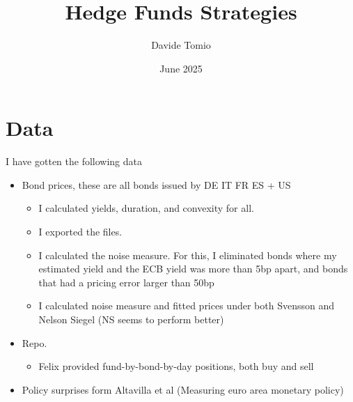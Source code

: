 \documentclass[12pt]{article}
\title{Hedge Funds Strategies}
\author{Davide Tomio}
\date{June 2025}
\begin{document}
\maketitle

\section{Data}

I have gotten the following data
\begin{itemize}
    \item Bond prices, these are all bonds issued by DE IT FR ES + US
    \begin{itemize}
        \item I calculated yields, duration, and convexity for all.
        \item I exported the files.
        \item I calculated the noise measure. For this, I eliminated bonds where my estimated yield and the ECB yield was more than 5bp apart, and bonds that had a pricing error larger than 50bp
        \item I calculated noise measure and fitted prices under both Svensson and Nelson Siegel (NS seems to perform better)
    \end{itemize}
    \item Repo.
    \begin{itemize}
        \item Felix provided fund-by-bond-by-day positions, both buy and sell
    \end{itemize}
    \item Policy surprises form Altavilla et al (Measuring euro area monetary policy)
    \end{itemize}
\end{document}
